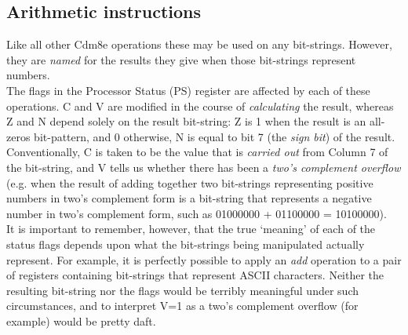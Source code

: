 \documentclass{ol-softwaremanual}
\begin{document}


    \subsection{Arithmetic instructions}
    Like all other Cdm8e operations these may be used on any bit-strings. However, they are {\em named} for the results they give when those bit-strings represent numbers.\\
    The flags in the Processor Status (PS) register are affected by each of these operations. C and V are modified in the course of {\em{calculating}} the result, whereas Z and N depend solely on the result bit-string: Z is 1 when the result is an all-zeros bit-pattern, and 0 otherwise, N is equal to bit 7 (the {\em{sign bit}}) of the result.\\
    Conventionally, C is taken to be the value that is {\em{carried out}} from Column 7 of the bit-string, and V tells us whether there has been a {\em{two's complement overflow}} (e.g. when the result of adding together two bit-strings representing positive numbers in two's complement form is a bit-string that represents a negative number in two's complement form, such as 01000000 + 01100000 = 10100000).\\
    It is important to remember, however, that the true `meaning' of each of the status flags depends upon what the bit-strings being manipulated actually represent. For example, it is perfectly possible to apply an {\em{add}} operation to a pair of registers containing bit-strings that represent ASCII characters. Neither the resulting bit-string nor the flags would be terribly meaningful under such circumstances, and to interpret V=1 as a two's complement overflow (for example) would be pretty daft.


\end{document}

